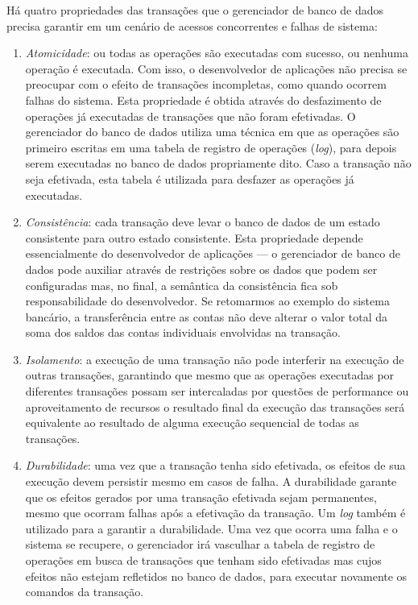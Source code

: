 \documentclass[11pt,twoside,a4paper]{book}
\begin{document}
Há quatro propriedades das transações que o gerenciador de banco de dados precisa garantir em um cenário de acessos concorrentes e falhas de sistema:

\begin{enumerate}
\item \emph{Atomicidade}: ou todas as operações são executadas com sucesso, ou nenhuma operação é executada. Com isso, o desenvolvedor de aplicações não precisa se preocupar com o efeito de transações incompletas, como quando ocorrem falhas do sistema. Esta propriedade é obtida através do desfazimento de operações já executadas de transações que não foram efetivadas. O gerenciador do banco de dados utiliza uma técnica em que as operações são primeiro escritas em uma tabela de registro de operações (\emph{log}), para depois serem executadas no banco de dados propriamente dito. Caso a transação não seja efetivada, esta tabela é utilizada para desfazer as operações já executadas.
\item \emph{Consistência}: cada transação deve levar o banco de dados de um estado consistente para outro estado consistente. Esta propriedade depende essencialmente do desenvolvedor de aplicações --- o gerenciador de banco de dados pode auxiliar através de restrições sobre os dados que podem ser configuradas mas, no final, a semântica da consistência fica sob responsabilidade do desenvolvedor. Se retomarmos ao exemplo do sistema bancário, a transferência entre as contas não deve alterar o valor total da soma dos saldos das contas individuais envolvidas na transação.
\item \emph{Isolamento}: a execução de uma transação não pode interferir na execução de outras transações, garantindo que mesmo que as operações executadas por diferentes transações possam ser intercaladas por questões de performance ou aproveitamento de recursos o resultado final da execução das transações será equivalente ao resultado de alguma execução sequencial de todas as transações.
\item \emph{Durabilidade}: uma vez que a transação tenha sido efetivada, os efeitos de sua execução devem persistir mesmo em casos de falha. A durabilidade garante que os efeitos gerados por uma transação efetivada sejam permanentes, mesmo que ocorram falhas após a efetivação da transação. Um \emph{log} também é utilizado para a garantir a durabilidade. Uma vez que ocorra uma falha e o sistema se recupere, o gerenciador irá vasculhar a tabela de registro de operações em busca de transações que tenham sido efetivadas mas cujos efeitos não estejam refletidos no banco de dados, para executar novamente os comandos da transação.
\end{enumerate}
\end{document}
